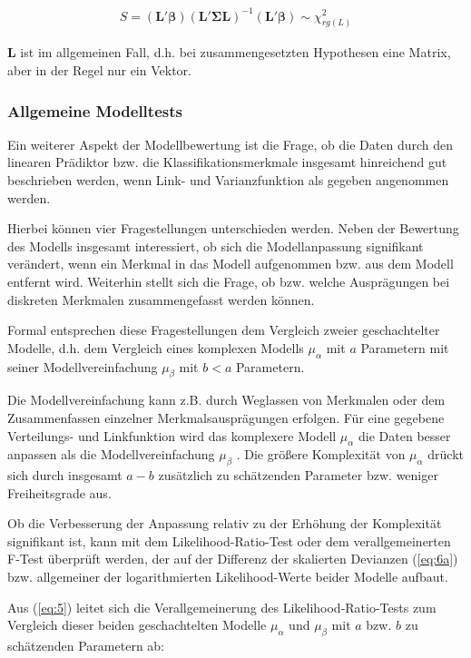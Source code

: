 \begin{eqnarray} 
S = (\bm{L'\beta}) (\bm{L'\Sigma L})^{-1} (\bm{L'\beta}) \sim \chi_{rg(L)}^2
\end{eqnarray}

$\bm{L}$ ist im allgemeinen Fall, d.h. bei zusammengesetzten Hypothesen eine Matrix, aber in der Regel nur ein Vektor.

\subsubsection{Allgemeine Modelltests}

Ein weiterer Aspekt der Modellbewertung ist die Frage, ob die Daten durch den linearen Prädiktor bzw. die Klassifikationsmerkmale insgesamt hinreichend gut beschrieben werden, wenn Link- und Varianzfunktion als gegeben angenommen werden. 

Hierbei können vier Fragestellungen unterschieden werden. Neben der Bewertung des Modells insgesamt interessiert, ob sich die Modellanpassung signifikant verändert, wenn ein Merkmal in das Modell aufgenommen bzw. aus dem Modell entfernt wird. Weiterhin stellt sich die Frage, ob bzw. welche Ausprägungen bei diskreten Merkmalen zusammengefasst werden können.

Formal entsprechen diese Fragestellungen dem Vergleich zweier geschachtelter Modelle, d.h. dem Vergleich eines komplexen Modells $\mu_\alpha$  mit $a$  Parametern mit seiner Modellvereinfachung $\mu_\beta$  mit $b<a$  Parametern.

Die Modellvereinfachung kann z.B. durch Weglassen von Merkmalen oder dem Zusammenfassen einzelner Merkmalsausprägungen erfolgen. Für eine gegebene Verteilungs- und Linkfunktion wird das komplexere Modell  $\mu_\alpha$ die Daten besser anpassen als die Modellvereinfachung $\mu_\beta$ . Die größere Komplexität von $\mu_\alpha$  drückt sich durch insgesamt $a-b$  zusätzlich zu schätzenden Parameter bzw. weniger Freiheitsgrade aus.

Ob die Verbesserung der Anpassung relativ zu der Erhöhung der Komplexität signifikant ist, kann mit dem Likelihood-Ratio-Test oder dem verallgemeinerten F-Test überprüft werden, der auf der Differenz der skalierten Devianzen (\ref{eq:6a}) bzw. allgemeiner der logarithmierten Likelihood-Werte beider Modelle aufbaut.

Aus (\ref{eq:5}) leitet sich die Verallgemeinerung des Likelihood-Ratio-Tests zum Vergleich dieser beiden geschachtelten Modelle $\mu_\alpha$  und $\mu_\beta$  mit $a$  bzw. $b$   zu schätzenden Parametern ab:

